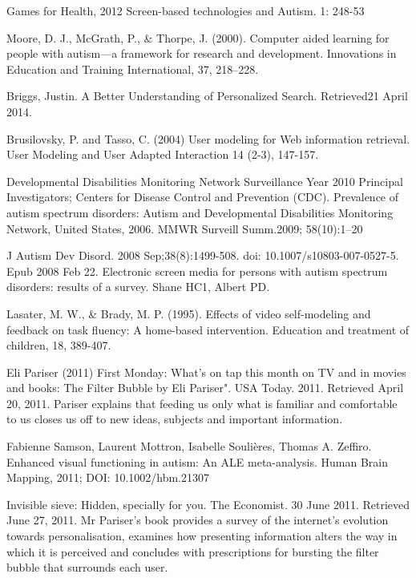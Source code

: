 \documentclass[10pt]{article}
\begin{document}
\begin{thebibliography}{100}

 Games for Health, 2012 Screen-based technologies and Autism. 1: 248-53

Moore, D. J., McGrath, P., \& Thorpe, J. (2000). Computer aided learning for people with autism—a framework for research and development. Innovations in Education and Training International, 37, 218–228.

Briggs, Justin. A Better Understanding of Personalized Search. Retrieved21 April 2014.


Brusilovsky, P. and Tasso, C. (2004) User modeling for Web information retrieval. User Modeling and User Adapted Interaction 14 (2-3), 147-157.


Developmental Disabilities Monitoring Network Surveillance Year 2010 Principal Investigators; Centers for Disease Control and Prevention (CDC). Prevalence of autism spectrum disorders: Autism and Developmental Disabilities Monitoring Network, United States, 2006. MMWR Surveill Summ.2009; 58(10):1–20


J Autism Dev Disord. 2008 Sep;38(8):1499-508. doi: 10.1007/s10803-007-0527-5. Epub 2008 Feb 22. Electronic screen media for persons with autism spectrum disorders: results of a survey.
Shane HC1, Albert PD.


Lasater, M. W., \& Brady, M. P. (1995). Effects of video self-modeling and feedback on task fluency: A home-based intervention. Education and treatment of children, 18, 389-407.


Eli Pariser (2011) First Monday: What's on tap this month on TV and in movies and books: The Filter Bubble by Eli Pariser". USA Today. 2011. Retrieved April 20, 2011. Pariser explains that feeding us only what is familiar and comfortable to us closes us off to new ideas, subjects and important information.

Fabienne Samson, Laurent Mottron, Isabelle Soulières, Thomas A. Zeffiro. Enhanced visual functioning in autism: An ALE meta-analysis. Human Brain Mapping, 2011; DOI: 10.1002/hbm.21307


 Invisible sieve: Hidden, specially for you. The Economist. 30 June 2011. Retrieved June 27, 2011. Mr Pariser’s book provides a survey of the internet’s evolution towards personalisation, examines how presenting information alters the way in which it is perceived and concludes with prescriptions for bursting the filter bubble that surrounds each user.


\end{thebibliography}
\end{document}
